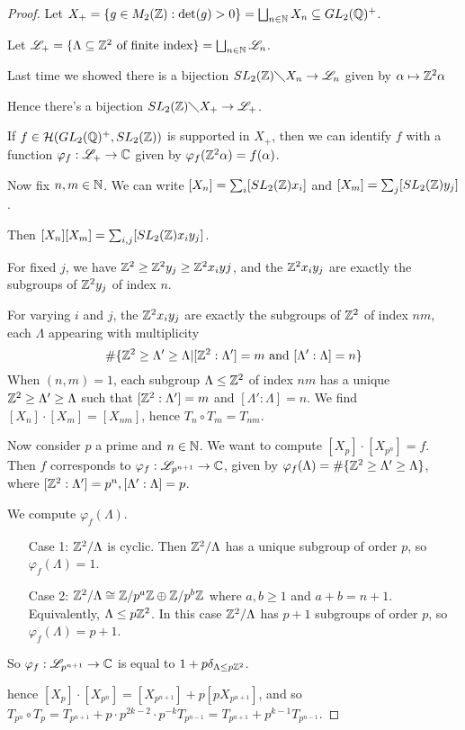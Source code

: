 \documentclass[10pt,a4paper]{article}
\begin{document}
\begin{proof}
  Let $X_+ = \{g \in M_2(\mathbb{Z}) : \det(g) > 0\} = \bigsqcup_{n \in \mathbb{N}} X_n \subseteq GL_2(\mathbb{Q})^+$.

  Let $\mathscr{L}_+ = \{\Lambda \subseteq \mathbb{Z}^2 \text{ of finite index}\} = \bigsqcup_{n \in \mathbb{N}} \mathscr{L}_n$.

  Last time we showed there is a bijection $SL_2(\mathbb{Z})\diagdown X_n \to \mathscr{L}_n$ given by $\alpha \mapsto \mathbb{Z}^2\alpha$

  Hence there's a bijection $SL_2(\mathbb{Z})\diagdown X_+ \to \mathscr{L}_+$.

  If $f \in \mathcal{H}(GL_2(\mathbb{Q})^+, SL_2(\mathbb{Z}))$ is supported in $X_+$, then we can identify $f$ with a function $\varphi_f : \mathscr{L}_+ \to \mathbb{C}$ given by $\varphi_f(\mathbb{Z}^2 \alpha) = f(\alpha)$.

  Now fix $n, m \in \mathbb{N}$. We can write $[X_n] = \sum_i [SL_2(\mathbb{Z})x_i]$ and $[X_m] = \sum_j [SL_2(\mathbb{Z})y_j]$.

  Then $[X_n][X_m] = \sum_{i,j} [SL_2(\mathbb{Z})x_iy_j]$.

  For fixed $j$, we have $\mathbb{Z}^2 \geq \mathbb{Z}^2y_j \geq \mathbb{Z}^2 x_iyj$, and the $\mathbb{Z}^2 x_iy_j$ are exactly the subgroups of $\mathbb{Z}^2 y_j$ of index $n$.

  For varying $i$ and $j$, the $\mathbb{Z}^2 x_iy_j$ are exactly the subgroups of $\mathbb{Z}^2$ of index $nm$, each $\Lambda$ appearing with multiplicity
  \[\#\{\mathbb{Z}^2 \geq \Lambda' \geq \Lambda | [\mathbb{Z}^2:\Lambda'] = m \text{ and }[\Lambda':\Lambda] = n\}\]
  When $(n,m) = 1$, each subgroup $\Lambda \leq \mathbb{Z}^2$ of index $nm$ has a unique $\mathbb{Z}^2 \geq \Lambda' \geq \Lambda$ such that $[\mathbb{Z}^2:\Lambda'] = m$ and $[\Lambda':\Lambda] = n$. We find $[X_n]\cdot [X_m] = [X_{nm}]$, hence $T_n\circ T_m = T_{nm}$.

  Now consider $p$ a prime and $n \in \mathbb{N}$. We want to compute $[X_p]\cdot [X_{p^n}] = f$. Then $f$ corresponds to $\varphi_f : \mathscr{L}_{p^{n+1}} \to \mathbb{C}$, given by $\varphi_f(\Lambda) = \#\{\mathbb{Z}^2\geq \Lambda'\geq \Lambda\}$, where $[\mathbb{Z}^2:\Lambda'] = p^n, [\Lambda':\Lambda] = p$.

  We compute $\varphi_f(\Lambda)$.
  \begin{itemize}
    \item[Case 1:] $\mathbb{Z}^2/\Lambda$ is cyclic. Then $\mathbb{Z}^2/\Lambda$ has a unique subgroup of order $p$, so $\varphi_f(\Lambda) = 1$.
    \item[Case 2:] $\mathbb{Z}^2/\Lambda \cong \mathbb{Z}/p^a\mathbb{Z} \oplus \mathbb{Z}/p^b\mathbb{Z}$ where $a,b \geq 1$ and $a+b = n+1$. Equivalently, $\Lambda \leq p\mathbb{Z}^2$. In this case $\mathbb{Z}^2/\Lambda$ has $p+1$ subgroups of order $p$, so $\varphi_f(\Lambda) = p+1$.
  \end{itemize}
  So $\varphi_f:\mathscr{L}_{p^{n+1}}\to \mathbb{C}$ is equal to $1 + p \delta_{\Lambda \leq p\mathbb{Z}^2}$.

  hence $[X_p]\cdot [X_{p^n}] = [X_{p^{n+1}}] + p[pX_{p^{n+1}}]$, and so $T_{p^n}\circ T_p = T_{p^{n+1}} + p \cdot p^{2k-2}\cdot p^{-k} T_{p^{n-1}} = T_{p^{n+1}}+p^{k-1}T_{p^{n-1}}$.
\end{proof}
\end{document}

